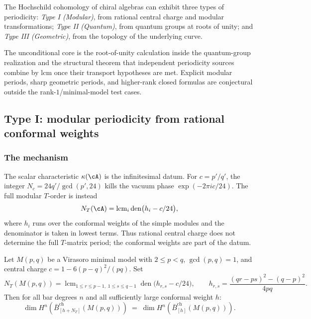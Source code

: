 The Hochschild cohomology of chiral algebras can exhibit three types of periodicity: \emph{Type I (Modular)}, from rational central charge and modular transformations; \emph{Type II (Quantum)}, from quantum groups at roots of unity; and \emph{Type III (Geometric)}, from the topology of the underlying curve.

\begin{remark}\label{rem:periodicity-scope}
The unconditional core is the root-of-unity calculation inside the
quantum-group realization and the structural theorem that independent
periodicity sources combine by lcm once their transport hypotheses are
met.
Explicit modular periods, sharp geometric periods, and higher-rank
closed formulas are conjectural outside the rank-$1$/minimal-model test
cases.
\end{remark}

\subsection{Type I: modular periodicity from rational conformal weights}

\subsubsection{The mechanism}

\begin{remark}
\label{rem:periodicity-as-exponential}
The scalar characteristic $\kappa(\cA)$ is the infinitesimal datum.
For $c=p'/q'$, the integer
$N_c=24q'/\gcd(p',24)$ kills the vacuum phase
$\exp(-2\pi i c/24)$. The full modular $T$-order is instead
\[
N_T(\cA)=\operatorname{lcm}_{i}\operatorname{den}
\bigl(h_i-c/24\bigr),
\]
where $h_i$ runs over the conformal weights of the simple modules and
the denominator is taken in lowest terms. Thus rational central charge
does not determine the full $T$-matrix period; the conformal weights are
part of the datum.
\end{remark}

\begin{conjecture}
\label{conj:modular-periodicity-minimal}
Let $M(p,q)$ be a Virasoro minimal model with $2 \leq p < q$, $\gcd(p,q) = 1$,
and central charge $c = 1 - 6(p-q)^2/(pq)$. Set
\[
N_T(M(p,q))
= \operatorname{lcm}_{1\le r\le p-1,\;1\le s\le q-1}
\operatorname{den}\bigl(h_{r,s}-c/24\bigr),
\qquad
h_{r,s}=\frac{(qr-ps)^2-(q-p)^2}{4pq}.
\]
Then for all bar degrees $n$ and all sufficiently large conformal weight $h$:
\[
\dim H^n(\bar{B}_{[h+N_T]}^{\mathrm{ch}}(M(p,q)))
\;=\;
\dim H^n(\bar{B}_{[h]}^{\mathrm{ch}}(M(p,q))).
\]
\end{conjecture}

